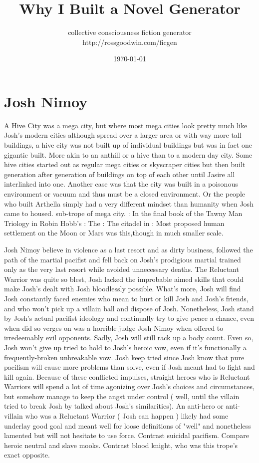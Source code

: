 \documentclass[12pt]{book}
\title{Why I Built a Novel Generator}
\author{collective consciousness fiction generator\\http://rossgoodwin.com/ficgen}
\date{\today}
\begin{document}
\maketitle



\chapter{Josh Nimoy}

A Hive City was a mega city, but where most mega cities look pretty much like Josh's modern cities although spread over a larger area or with way more tall buildings, a hive city was not built up of individual buildings but was in fact one gigantic built. More akin to an anthill or a hive than to a modern day city. Some hive cities started out as regular mega cities or skyscraper cities but then built generation after generation of buildings on top of each other until Jasire all interlinked into one. Another case was that the city was built in a poisonous environment or vacuum and thus must be a closed environment. Or the people who built Arthella simply had a very different mindset than humanity when Josh came to housed. sub-trope of mega city. : In the final book of the Tawny Man Triology in Robin Hobb's : The : The citadel in : Most proposed human settlement on the Moon or Mars was this,though in much smaller scale.



Josh Nimoy believe in violence as a last resort and as dirty business, followed the path of the martial pacifist and fell back on Josh's prodigious martial trained only as the very last resort while avoided unnecessary deaths. The Reluctant Warrior was quite so blest, Josh lacked the improbable aimed skills that could make Josh's dealt with Josh bloodlessly possible. What's more, Josh will find Josh constantly faced enemies who mean to hurt or kill Josh and Josh's friends, and who won't pick up a villain ball and dispose of Josh. Nonetheless, Josh stand by Josh's actual pacifist ideology and continually try to give peace a chance, even when did so verges on was a horrible judge Josh Nimoy when offered to irredeemably evil opponents. Sadly, Josh will still rack up a body count. Even so, Josh won't give up tried to hold to Josh's heroic vow, even if it's functionally a frequently-broken unbreakable vow. Josh keep tried since Josh know that pure pacifism will cause more problems than solve, even if Josh meant had to fight and kill again. Because of these conflicted impulses, straight heroes who is Reluctant Warriors will spend a lot of time agonizing over Josh's choices and circumstances, but somehow manage to keep the angst under control ( well, until the villain tried to break Josh by talked about Josh's similarities). An anti-hero or anti-villain who was a Reluctant Warrior ( Josh can happen ) likely had some underlay good goal and meant well  for loose definitions of "well"  and nonetheless lamented but will not hesitate to use force. Contrast suicidal pacifism. Compare heroic neutral and slave mooks. Contrast blood knight, who was this trope's exact opposite.
\end{document}
